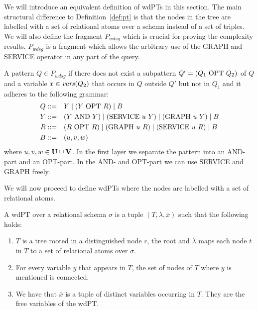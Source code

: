 We will introduce an equivalent definition of wdPTs in this section. The
main structural difference to Definition~\ref{def:pt} is that the nodes in the
tree are labelled with a set of relational atoms over a schema instead of a set of triples. 
We will also define the fragment $P_{wdsg}$ which is crucial for proving the
complexity results. $P_{wdsg}$ is a fragment which allows the arbitrary use of
the GRAPH and SERVICE operator in any part of the query.

\begin{definition}[$P_{wdsg}$]
	A pattern $Q \in P_{wdsg}$ if there does not exist a subpattern $Q' = (Q_1
	\mbox{ OPT } Q_2)$ of $Q$ and a variable $x \in \mathit{vars}(Q_2)$ that occurs in $Q$
	outside $Q'$ but not in $Q_1$ and it adheres to the following grammar:
	\begin{align*}
		Q::= &\quad Y \mid (Y \mbox{ OPT } R)  \mid B \\
		Y::= &\quad (Y \mbox{ AND } Y) \mid (\mbox{SERVICE } u \ Y) \mid (\mbox{GRAPH } u \
		Y) \mid  B\\
		R::= &\quad(R \mbox{ OPT } R) \mid (\mbox{GRAPH } u \ R) \mid (\mbox{SERVICE } u \ R) \mid B  \\
		B::= &\quad(u,v,w)
	\end{align*}
	where	$u,v,w \in \mathbf{U} \cup \mathbf{V}$. In the first layer we separate the pattern
	into an AND-part and an OPT-part. In the AND- and OPT-part we can use
	SERVICE and GRAPH freely. 
\end{definition}

We will now proceed to define wdPTs where the nodes are labelled with a set of relational atoms.

\begin{definition}\label{def:wdpt}
	A wdPT over a relational schema $\sigma$ is a tuple $(T, \lambda, \overline{x})$
	such that the following holds:
	\begin{enumerate}
		\item $T$ is a tree rooted in a distinguished node $r$, the root and $\lambda$
			maps each node $t$ in $T$ to a set of relational atoms over $\sigma$.
		\item For every variable $y$ that appears in $T$, the set of nodes of $T$ where
			$y$ is mentioned is connected.
		\item We have that $\overline{x}$ is a tuple of distinct variables occurring in
			$T$. They are the free variables of the wdPT.
	\end{enumerate}
\end{definition}

